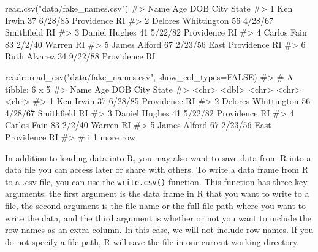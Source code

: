 \documentclass[
  letterpaper,
]{krantz}
\makeatletter
\newenvironment{Shaded}{\begin{snugshade}}{\end{snugshade}}
\newcommand{\AttributeTok}[1]{\textcolor[rgb]{0.40,0.45,0.13}{#1}}
\newcommand{\CommentTok}[1]{\textcolor[rgb]{0.37,0.37,0.37}{#1}}
\newcommand{\ConstantTok}[1]{\textcolor[rgb]{0.56,0.35,0.01}{#1}}
\newcommand{\FunctionTok}[1]{\textcolor[rgb]{0.28,0.35,0.67}{#1}}
\newcommand{\NormalTok}[1]{\textcolor[rgb]{0.00,0.23,0.31}{#1}}
\newcommand{\SpecialCharTok}[1]{\textcolor[rgb]{0.37,0.37,0.37}{#1}}
\newcommand{\StringTok}[1]{\textcolor[rgb]{0.13,0.47,0.30}{#1}}
\newenvironment{kframe}{%
\medskip{}
\setlength{\fboxsep}{.8em}
 \def\at@end@of@kframe{}%
 \ifinner\ifhmode%
  \def\at@end@of@kframe{\end{minipage}}%
  \begin{minipage}{\columnwidth}%
 \fi\fi%
 \def\FrameCommand##1{\hskip\@totalleftmargin \hskip-\fboxsep
 \colorbox{shadecolor}{##1}\hskip-\fboxsep
     \hskip-\linewidth \hskip-\@totalleftmargin \hskip\columnwidth}%
 \MakeFramed {\advance\hsize-\width
   \@totalleftmargin\z@ \linewidth\hsize
   \@setminipage}}%
 {\par\unskip\endMakeFramed%
 \at@end@of@kframe}
\renewenvironment{Shaded}{\begin{kframe}}{\end{kframe}}
\makeatother
\begin{document}
\begin{Shaded}
\begin{Highlighting}[]
\FunctionTok{read.csv}\NormalTok{(}\StringTok{"data/fake\_names.csv"}\NormalTok{)}
\CommentTok{\#\textgreater{}                  Name Age     DOB            City State}
\CommentTok{\#\textgreater{} 1           Ken Irwin  37 6/28/85      Providence    RI}
\CommentTok{\#\textgreater{} 2 Delores Whittington  56 4/28/67      Smithfield    RI}
\CommentTok{\#\textgreater{} 3       Daniel Hughes  41 5/22/82      Providence    RI}
\CommentTok{\#\textgreater{} 4         Carlos Fain  83  2/2/40          Warren    RI}
\CommentTok{\#\textgreater{} 5        James Alford  67 2/23/56 East Providence    RI}
\CommentTok{\#\textgreater{} 6        Ruth Alvarez  34 9/22/88      Providence    RI}
\end{Highlighting}
\end{Shaded}

\begin{Shaded}
\begin{Highlighting}[]
\NormalTok{readr}\SpecialCharTok{::}\FunctionTok{read\_csv}\NormalTok{(}\StringTok{"data/fake\_names.csv"}\NormalTok{, }\AttributeTok{show\_col\_types=}\ConstantTok{FALSE}\NormalTok{)}
\CommentTok{\#\textgreater{} \# A tibble: 6 x 5}
\CommentTok{\#\textgreater{}   Name                  Age DOB     City            State}
\CommentTok{\#\textgreater{}   \textless{}chr\textgreater{}               \textless{}dbl\textgreater{} \textless{}chr\textgreater{}   \textless{}chr\textgreater{}           \textless{}chr\textgreater{}}
\CommentTok{\#\textgreater{} 1 Ken Irwin              37 6/28/85 Providence      RI   }
\CommentTok{\#\textgreater{} 2 Delores Whittington    56 4/28/67 Smithfield      RI   }
\CommentTok{\#\textgreater{} 3 Daniel Hughes          41 5/22/82 Providence      RI   }
\CommentTok{\#\textgreater{} 4 Carlos Fain            83 2/2/40  Warren          RI   }
\CommentTok{\#\textgreater{} 5 James Alford           67 2/23/56 East Providence RI   }
\CommentTok{\#\textgreater{} \# i 1 more row}
\end{Highlighting}
\end{Shaded}

In addition to loading data into R, you may also want to save data from
R into a data file you can access later or share with others. To write a
data frame from R to a .csv file, you can use the \texttt{write.csv()}
function. This function has three key arguments: the first argument is
the data frame in R that you want to write to a file, the second
argument is the file name or the full file path where you want to write
the data, and the third argument is whether or not you want to include
the row names as an extra column. In this case, we will not include row
names. If you do not specify a file path, R will save the file in our
current working directory.
\end{document}
